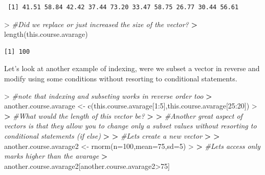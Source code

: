 \documentclass[
]{book}
\newenvironment{Shaded}{\begin{snugshade}}{\end{snugshade}}
\newcommand{\AttributeTok}[1]{\textcolor[rgb]{0.77,0.63,0.00}{#1}}
\newcommand{\CommentTok}[1]{\textcolor[rgb]{0.56,0.35,0.01}{\textit{#1}}}
\newcommand{\DecValTok}[1]{\textcolor[rgb]{0.00,0.00,0.81}{#1}}
\newcommand{\ErrorTok}[1]{\textcolor[rgb]{0.64,0.00,0.00}{\textbf{#1}}}
\newcommand{\FunctionTok}[1]{\textcolor[rgb]{0.00,0.00,0.00}{#1}}
\newcommand{\NormalTok}[1]{#1}
\newcommand{\OtherTok}[1]{\textcolor[rgb]{0.56,0.35,0.01}{#1}}
\newcommand{\SpecialCharTok}[1]{\textcolor[rgb]{0.00,0.00,0.00}{#1}}
\theoremstyle{definition}
\theoremstyle{definition}
\theoremstyle{definition}
\theoremstyle{definition}
\theoremstyle{remark}
\begin{document}
\begin{verbatim}
 [1] 41.51 58.84 42.42 37.44 73.20 33.47 58.75 26.77 30.44 56.61
\end{verbatim}

\begin{Shaded}
\begin{Highlighting}[]
\SpecialCharTok{\textgreater{}} \CommentTok{\#Did we replace or just increased the size of the vector? }
\ErrorTok{\textgreater{}} \FunctionTok{length}\NormalTok{(this.course.avarage)}
\end{Highlighting}
\end{Shaded}

\begin{verbatim}
[1] 100
\end{verbatim}

Let's look at another example of indexing, were we subset a vector in reverse and modify using some conditions without
resorting to conditional statements.

\begin{Shaded}
\begin{Highlighting}[]
\SpecialCharTok{\textgreater{}} \CommentTok{\#note that indexing and subseting works in reverse order too}
\ErrorTok{\textgreater{}}\NormalTok{ another.course.avarage }\OtherTok{\textless{}{-}} \FunctionTok{c}\NormalTok{(this.course.avarage[}\DecValTok{1}\SpecialCharTok{:}\DecValTok{5}\NormalTok{],this.course.avarage[}\DecValTok{25}\SpecialCharTok{:}\DecValTok{20}\NormalTok{])}
\SpecialCharTok{\textgreater{}} 
\ErrorTok{\textgreater{}} \CommentTok{\#What would the length of this vector be?}
\ErrorTok{\textgreater{}} 
\ErrorTok{\textgreater{}} \CommentTok{\#Another great aspect of vectors is that they allow you to change only a subset values without resorting to conditional statements (if else)}
\ErrorTok{\textgreater{}} 
\ErrorTok{\textgreater{}} \CommentTok{\#Let\textquotesingle{}s create a new vector}
\ErrorTok{\textgreater{}} 
\ErrorTok{\textgreater{}}\NormalTok{ another.course.avarage2 }\OtherTok{\textless{}{-}} \FunctionTok{rnorm}\NormalTok{(}\AttributeTok{n=}\DecValTok{100}\NormalTok{,}\AttributeTok{mean=}\DecValTok{75}\NormalTok{,}\AttributeTok{sd=}\DecValTok{5}\NormalTok{)}
\SpecialCharTok{\textgreater{}} 
\ErrorTok{\textgreater{}} \CommentTok{\#Let\textquotesingle{}s access only marks higher than the avarage}
\ErrorTok{\textgreater{}}\NormalTok{ another.course.avarage2[another.course.avarage2}\SpecialCharTok{\textgreater{}}\DecValTok{75}\NormalTok{]}
\end{Highlighting}
\end{Shaded}
\end{document}
